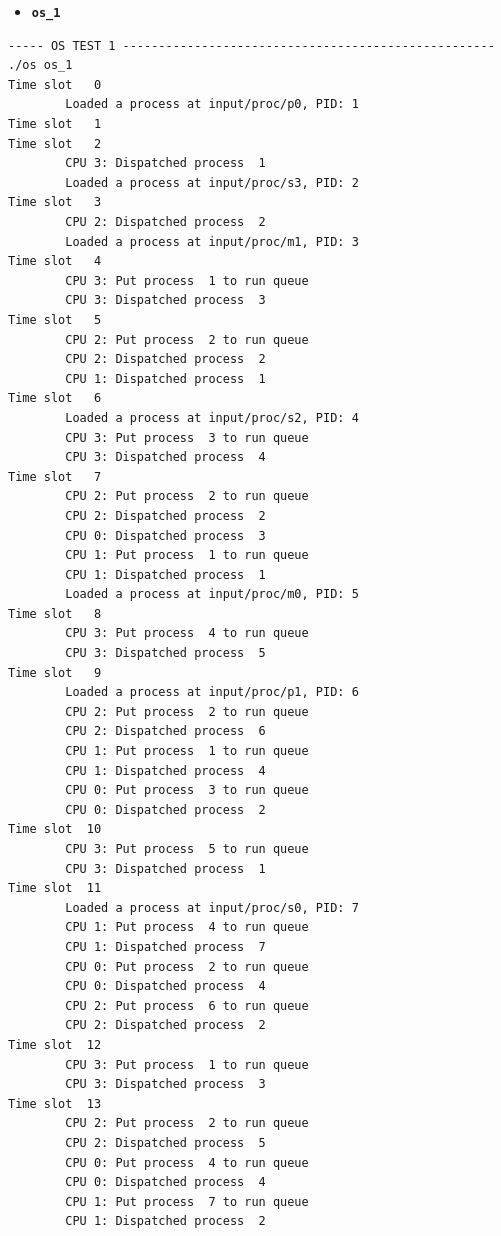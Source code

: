 \documentclass[a4paper]{article}
\numberwithin{equation}{section}
\begin{document}
\begin{itemize}
  \item \textbf{ \texttt{os_1}}
\end{itemize}

\begin{mdframed}[leftline=false,rightline=false,backgroundcolor=teal!10,nobreak=false]
  \begin{verbatim}
----- OS TEST 1 ----------------------------------------------------
./os os_1
Time slot   0
        Loaded a process at input/proc/p0, PID: 1
Time slot   1
Time slot   2
        CPU 3: Dispatched process  1
        Loaded a process at input/proc/s3, PID: 2
Time slot   3
        CPU 2: Dispatched process  2
        Loaded a process at input/proc/m1, PID: 3
Time slot   4
        CPU 3: Put process  1 to run queue
        CPU 3: Dispatched process  3
Time slot   5
        CPU 2: Put process  2 to run queue
        CPU 2: Dispatched process  2
        CPU 1: Dispatched process  1
Time slot   6
        Loaded a process at input/proc/s2, PID: 4
        CPU 3: Put process  3 to run queue
        CPU 3: Dispatched process  4
Time slot   7
        CPU 2: Put process  2 to run queue
        CPU 2: Dispatched process  2
        CPU 0: Dispatched process  3
        CPU 1: Put process  1 to run queue
        CPU 1: Dispatched process  1
        Loaded a process at input/proc/m0, PID: 5
Time slot   8
        CPU 3: Put process  4 to run queue
        CPU 3: Dispatched process  5
Time slot   9
        Loaded a process at input/proc/p1, PID: 6
        CPU 2: Put process  2 to run queue
        CPU 2: Dispatched process  6
        CPU 1: Put process  1 to run queue
        CPU 1: Dispatched process  4
        CPU 0: Put process  3 to run queue
        CPU 0: Dispatched process  2
Time slot  10
        CPU 3: Put process  5 to run queue
        CPU 3: Dispatched process  1
Time slot  11
        Loaded a process at input/proc/s0, PID: 7
        CPU 1: Put process  4 to run queue
        CPU 1: Dispatched process  7
        CPU 0: Put process  2 to run queue
        CPU 0: Dispatched process  4
        CPU 2: Put process  6 to run queue
        CPU 2: Dispatched process  2
Time slot  12
        CPU 3: Put process  1 to run queue
        CPU 3: Dispatched process  3
Time slot  13
        CPU 2: Put process  2 to run queue
        CPU 2: Dispatched process  5
        CPU 0: Put process  4 to run queue
        CPU 0: Dispatched process  4
        CPU 1: Put process  7 to run queue
        CPU 1: Dispatched process  2

\end{verbatim}
\end{mdframed}
\end{document}
